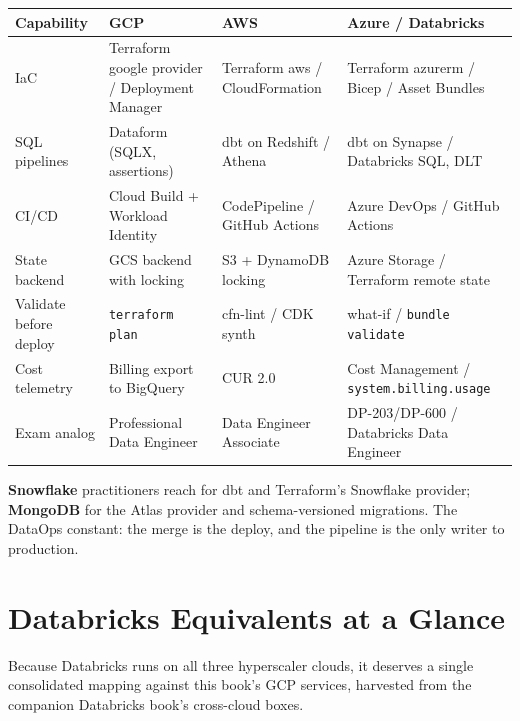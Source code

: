 \begin{center}
\footnotesize
\begin{tabular}{@{}p{2.8cm}p{3.0cm}p{3.0cm}p{3.4cm}@{}}
\toprule
\textbf{Capability} & \textbf{GCP} & \textbf{AWS} & \textbf{Azure / Databricks} \\
\midrule
IaC & Terraform google provider / Deployment Manager & Terraform aws / CloudFormation & Terraform azurerm / Bicep / Asset Bundles \\
SQL pipelines & Dataform (SQLX, assertions) & dbt on Redshift / Athena & dbt on Synapse / Databricks SQL, DLT \\
CI/CD & Cloud Build + Workload Identity & CodePipeline / GitHub Actions & Azure DevOps / GitHub Actions \\
State backend & GCS backend with locking & S3 + DynamoDB locking & Azure Storage / Terraform remote state \\
Validate before deploy & \texttt{terraform plan} & cfn-lint / CDK synth & what-if / \texttt{bundle validate} \\
Cost telemetry & Billing export to BigQuery & CUR 2.0 & Cost Management / \texttt{system.billing.usage} \\
Exam analog & Professional Data Engineer & Data Engineer Associate & DP-203/DP-600 / Databricks Data Engineer \\
\bottomrule
\end{tabular}
\end{center}

\noindent \textbf{Snowflake} practitioners reach for dbt and Terraform's Snowflake provider;
\textbf{MongoDB} for the Atlas provider and schema-versioned migrations. The DataOps constant:
the merge is the deploy, and the pipeline is the only writer to production.

\section{Databricks Equivalents at a Glance}
%
Because Databricks runs on all three hyperscaler clouds, it deserves a single consolidated mapping
against this book's GCP services, harvested from the companion Databricks book's cross-cloud
boxes.

